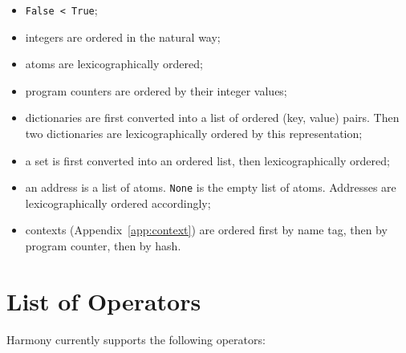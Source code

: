 \documentclass{report}
\begin{document}
\begin{itemize}
\item \texttt{False < True};
\item integers are ordered in the natural way;
\item atoms are lexicographically ordered;
\item program counters are ordered by their integer values;
\item dictionaries are first converted into a list of ordered (key, value)
pairs.  Then two dictionaries are lexicographically ordered by this
representation;
\item a set is first converted into an ordered list, then lexicographically
ordered;
\item an address is a list of atoms.  \texttt{None} is the empty list of atoms.
Addresses are lexicographically ordered accordingly;
\item contexts (Appendix~\ref{app:context}) are ordered first by name tag, then by program counter, then by hash.
\end{itemize}

\chapter{List of Operators}

Harmony currently supports the following operators:
\vspace{1em}
\end{document}
